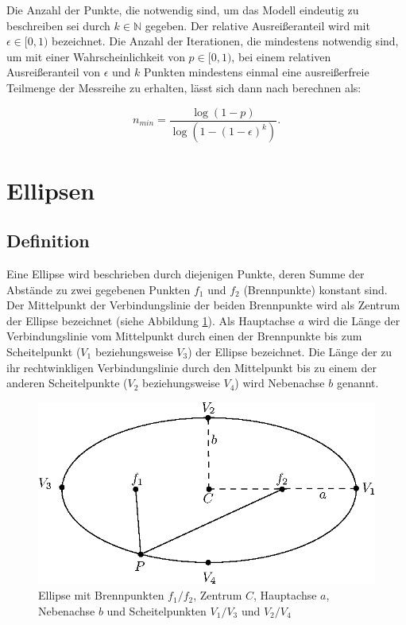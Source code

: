 Die Anzahl der Punkte, die notwendig sind, um das Modell eindeutig zu beschreiben sei durch $k\in\mathbb{N}$ gegeben. Der relative Ausreißeranteil wird mit $\epsilon \in[0,1)$ bezeichnet.
Die Anzahl der Iterationen, die mindestens notwendig sind, um mit einer Wahrscheinlichkeit von $p \in [0,1)$, bei einem relativen Ausreißeranteil von $\epsilon$ und $k$ Punkten mindestens einmal eine ausreißerfreie Teilmenge der Messreihe zu erhalten, lässt sich dann nach \cite{Fischler1981} berechnen als:

\begin{equation}
n_{min} = \frac{\log{\left(1-p\right)}}{\log{\left(1-\left(1-\epsilon\right)^k\right)}}.
\end{equation}


\section{Ellipsen}
\label{s:ellipse}
\subsection{Definition}
\label{s:ellipseGeneral}

\begin{definition}[Ellipse]
	Eine Ellipse wird beschrieben durch diejenigen Punkte, deren Summe der Abstände zu zwei gegebenen Punkten $f_1$ und $f_2$ (Brennpunkte) konstant sind. Der Mittelpunkt der Verbindungslinie der beiden Brennpunkte wird als Zentrum der Ellipse bezeichnet (siehe Abbildung \ref{fig:ellipseDef}).
	Als Hauptachse $a$ wird die Länge der Verbindungslinie vom Mittelpunkt durch einen der Brennpunkte bis zum Scheitelpunkt ($V_1$ beziehungsweise $V_3$) der Ellipse bezeichnet. Die Länge der zu ihr rechtwinkligen Verbindungslinie durch den Mittelpunkt bis zu einem der anderen Scheitelpunkte ($V_2$ beziehungsweise $V_4$) wird Nebenachse $b$ genannt.
\end{definition}

\begin{figure}[!htb]
	\centering
	\includegraphics[scale=.9]{images/ellipse_focalDef.eps}
	\caption{Ellipse mit Brennpunkten $f_1/f_2$, Zentrum $C$, Hauptachse $a$, Nebenachse $b$ und Scheitelpunkten $V_1/V_3$ und $V_2/V_4$}
	\label{fig:ellipseDef}
\end{figure}


